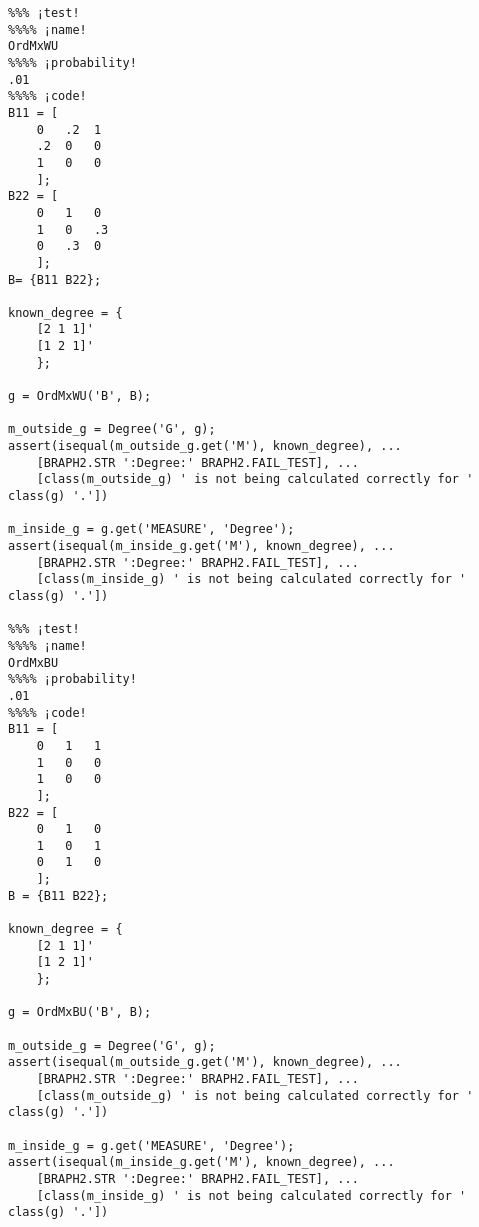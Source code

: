 \documentclass{tufte-handout}
\begin{document}
\begin{lstlisting}
%%% ¡test!
%%%% ¡name!
OrdMxWU
%%%% ¡probability!
.01
%%%% ¡code!
B11 = [
    0   .2  1
    .2  0   0
    1   0   0
    ];
B22 = [
    0   1   0
    1   0   .3
    0   .3  0
    ];
B= {B11 B22};

known_degree = {
    [2 1 1]'
    [1 2 1]'
    };

g = OrdMxWU('B', B);

m_outside_g = Degree('G', g);
assert(isequal(m_outside_g.get('M'), known_degree), ...
    [BRAPH2.STR ':Degree:' BRAPH2.FAIL_TEST], ...
    [class(m_outside_g) ' is not being calculated correctly for ' class(g) '.'])

m_inside_g = g.get('MEASURE', 'Degree');
assert(isequal(m_inside_g.get('M'), known_degree), ...
    [BRAPH2.STR ':Degree:' BRAPH2.FAIL_TEST], ...
    [class(m_inside_g) ' is not being calculated correctly for ' class(g) '.'])

%%% ¡test!
%%%% ¡name!
OrdMxBU
%%%% ¡probability!
.01
%%%% ¡code!
B11 = [
    0   1   1
    1   0   0
    1   0   0
    ];
B22 = [
    0   1   0
    1   0   1
    0   1   0
    ];
B = {B11 B22};

known_degree = {
    [2 1 1]'
    [1 2 1]'
    };

g = OrdMxBU('B', B);

m_outside_g = Degree('G', g);
assert(isequal(m_outside_g.get('M'), known_degree), ...
    [BRAPH2.STR ':Degree:' BRAPH2.FAIL_TEST], ...
    [class(m_outside_g) ' is not being calculated correctly for ' class(g) '.'])

m_inside_g = g.get('MEASURE', 'Degree');
assert(isequal(m_inside_g.get('M'), known_degree), ...
    [BRAPH2.STR ':Degree:' BRAPH2.FAIL_TEST], ...
    [class(m_inside_g) ' is not being calculated correctly for ' class(g) '.'])
\end{lstlisting}


%
%
\end{document}
